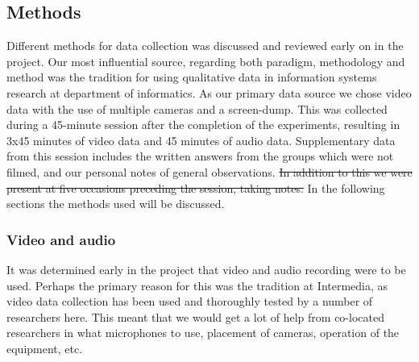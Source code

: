 \subsection{Methods}
Different methods for data collection was discussed and reviewed early on in the project. Our most influential source, regarding both paradigm, methodology and method was the tradition for using qualitative data in information systems research at department of informatics. As our primary data source we chose video data with the use of multiple cameras and a screen-dump. This was collected during a 45-minute session after the completion of the experiments, resulting in 3x45 minutes of video data and 45 minutes of audio data. Supplementary data from this session includes the written answers from the groups which were not filmed, and our personal notes of general observations. \sout{In addition to this we were present at five occasions preceding the session, taking notes.} In the following sections the methods used will be discussed. 

\subsubsection{Video and audio}
It was determined early in the project that video and audio recording were to be used. Perhaps the primary reason for this was the tradition at Intermedia, as video data collection has been used and thoroughly tested by a number of researchers here. This meant that we would get a lot of help from co-located researchers in what microphones to use, placement of cameras, operation of the equipment, etc. 

